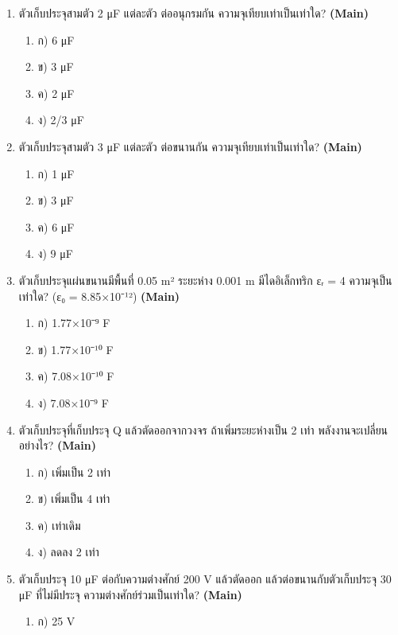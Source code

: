 \documentclass[12pt]{article}
\begin{document}
\begin{enumerate}[label=\arabic*.]
\begin{enumerate}[label=)]
\item ค) ลดความจุไฟฟ้า
\item ง) เปลี่ยนไฟฟ้ากระแสตรงเป็นสลับ
\end{enumerate}
\item ตัวเก็บประจุสามตัว 2 μF แต่ละตัว ต่ออนุกรมกัน ความจุเทียบเท่าเป็นเท่าใด? \hfill \textbf{\small (Main)}
\begin{enumerate}[label=)]
\item ก) 6 μF
\item ข) 3 μF
\item ค) 2 μF
\item ง) 2/3 μF
\end{enumerate}
\item ตัวเก็บประจุสามตัว 3 μF แต่ละตัว ต่อขนานกัน ความจุเทียบเท่าเป็นเท่าใด? \hfill \textbf{\small (Main)}
\begin{enumerate}[label=)]
\item ก) 1 μF
\item ข) 3 μF
\item ค) 6 μF
\item ง) 9 μF
\end{enumerate}
\item ตัวเก็บประจุแผ่นขนานมีพื้นที่ 0.05 m² ระยะห่าง 0.001 m มีไดอิเล็กทริก εᵣ = 4 ความจุเป็นเท่าใด? (ε₀ = 8.85×10⁻¹²) \hfill \textbf{\small (Main)}
\begin{enumerate}[label=)]
\item ก) 1.77×10⁻⁹ F
\item ข) 1.77×10⁻¹⁰ F
\item ค) 7.08×10⁻¹⁰ F
\item ง) 7.08×10⁻⁹ F
\end{enumerate}
\item ตัวเก็บประจุที่เก็บประจุ Q แล้วตัดออกจากวงจร ถ้าเพิ่มระยะห่างเป็น 2 เท่า พลังงานจะเปลี่ยนอย่างไร? \hfill \textbf{\small (Main)}
\begin{enumerate}[label=)]
\item ก) เพิ่มเป็น 2 เท่า
\item ข) เพิ่มเป็น 4 เท่า
\item ค) เท่าเดิม
\item ง) ลดลง 2 เท่า
\end{enumerate}
\item ตัวเก็บประจุ 10 μF ต่อกับความต่างศักย์ 200 V แล้วตัดออก แล้วต่อขนานกับตัวเก็บประจุ 30 μF ที่ไม่มีประจุ ความต่างศักย์ร่วมเป็นเท่าใด? \hfill \textbf{\small (Main)}
\begin{enumerate}[label=)]
\item ก) 25 V

\end{enumerate}
\end{enumerate}
\end{document}
